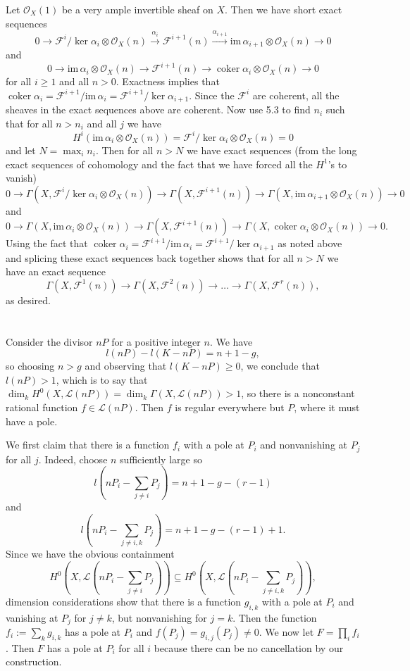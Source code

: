 \documentclass{report}
\renewcommand{\L}{\mathscr{L}}
\renewcommand{\Im}{\mathrm{im\,}}
\newcommand{\F}{\mathcal{F}}
\renewcommand{\O}{\mathcal{O}}
\DeclareMathOperator{\coker}{coker}
\begin{document}
\bigskip
{} Let $\O_X(1)$ be a very ample invertible sheaf on $X$.  Then we have short exact sequences
$$0\rightarrow \F^i/\ker{\alpha_i}\otimes\O_X(n)\xrightarrow{\alpha_i} \F^{i+1}(n)\xrightarrow{\alpha_{i+1}} \Im \alpha_{i+1}\otimes\O_X(n)\rightarrow 0$$
and
$$0\rightarrow \Im \alpha_{i}\otimes\O_X(n)\rightarrow \F^{i+1}(n)\rightarrow \coker \alpha_i\otimes\O_X(n) \rightarrow 0$$
for all $i\ge1$ and all $n>0$.  Exactness implies that $\coker\alpha_i=\F^{i+1}/\Im\alpha_i=\F^{i+1}/\ker \alpha_{i+1}$.
Since the $\F^i$ are coherent, all the sheaves in the exact sequences above are coherent.  Now use 5.3 to find
$n_i$ such that for all $n>n_i$ and all $j$ we have 
$$H^i(\Im\alpha_i\otimes\O_X(n))=\F^i/\ker\alpha_i\otimes\O_X(n)=0$$ and let $N=\max_i n_i$.  Then for all $n>N$
we have exact sequences (from the long exact sequences of cohomology and the fact that we have forced all the $H^1$'s to vanish)
$$0\rightarrow \Gamma(X,\F^{i}/\ker\alpha_i\otimes\O_X(n))
\rightarrow \Gamma(X,\F^{i+1}(n))\rightarrow \Gamma(X,\Im\alpha_{i+1}\otimes\O_X(n))
\rightarrow 0
$$
and
$$0\rightarrow \Gamma(X,\Im \alpha_{i}\otimes\O_X(n))
\rightarrow \Gamma(X,\F^{i+1}(n))\rightarrow \Gamma(X,\coker \alpha_i\otimes\O_X(n)) \rightarrow 0.$$
Using the fact that $\coker\alpha_i=\F^{i+1}/\Im\alpha_i=\F^{i+1}/\ker \alpha_{i+1}$ as noted above and splicing
these exact sequences back together shows that for all $n>N$ we have an exact sequence
$$\Gamma(X,\F^1(n))\rightarrow\Gamma(X,\F^2(n))\rightarrow\ldots\rightarrow\Gamma(X,\F^r(n)),$$
as desired.


\chapter{}

\section{}

\bigskip
{}	Consider the divisor $nP$ for a positive integer $n$.  We have 
$$l(nP)-l(K-nP)=n+1-g,$$	
so choosing $n> g$ and observing that $l(K-nP)\ge 0$, we conclude that $l(nP)>1$,
which is to say that $\dim_k H^0(X,\L(nP))=\dim_k\Gamma(X,\L(nP))>1$, so there is
a nonconstant rational function $f\in \L(nP)$.  Then $f$ is regular everywhere but $P$,
where it must have a pole.


\bigskip
{}	We first claim that there is a function $f_i$ with a pole at $P_i$ and nonvanishing at $P_j$ for all $j$.
Indeed, choose $n$ sufficiently large so 
$$l(nP_i -\sum_{j\neq i} P_j)= n+1-g-(r-1)$$
and
$$l(nP_i -\sum_{j\neq i,k} P_j)= n+1-g-(r-1)+1.$$
Since we have the obvious containment 
$$H^0(X,\L(nP_i-\sum_{j\neq i} P_j))\subseteq H^0(X,\L(nP_i-\sum_{j\neq i,k} P_j)),$$
dimension considerations show that there is a function $g_{i,k}$ with a pole at $P_i$
and vanishing at $P_j$ for $j\neq k$, but nonvanishing for $j=k$.
Then the function
$f_i:=\sum_k g_{i,k}$ has a pole at $P_i$ and $f(P_j)=g_{i,j}(P_j)\neq 0$.
We now let $F=\prod_i f_i$.  Then $F$ has a pole at $P_i$ for all $i$ because there
can be no cancellation by our construction.
\end{document}
